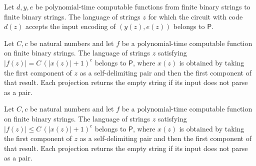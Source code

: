 \begin{theorem}
\label{Complexity.KarpLipton.pred_query}
\leanok
{}
Let $d,y,e$ be polynomial-time computable functions from finite binary strings to finite
binary strings. The language of strings $z$ for which the circuit with code $d(z)$ accepts
the input encoding of $(y(z),e(z))$ belongs to $\mathsf{P}$.
\end{theorem}

\begin{theorem}
\label{Complexity.KarpLipton.pred_len_eq}
\leanok
{}
Let $C,c$ be natural numbers and let $f$ be a polynomial-time computable function on
finite binary strings. The language of strings $z$ satisfying
$|f(z)| = C\,(|x(z)|+1)^c$ belongs to $\mathsf{P}$, where $x(z)$ is obtained by
taking the first component of $z$ as a self-delimiting pair and then the first component
of that result. Each projection returns the empty string if its input does not parse as a
pair.
\end{theorem}

\begin{theorem}
\label{Complexity.KarpLipton.pred_len_le}
\leanok
{}
Let $C,c$ be natural numbers and let $f$ be a polynomial-time computable function on
finite binary strings. The language of strings $z$ satisfying
$|f(z)| \le C\,(|x(z)|+1)^c$ belongs to $\mathsf{P}$, where $x(z)$ is obtained by
taking the first component of $z$ as a self-delimiting pair and then the first component
of that result. Each projection returns the empty string if its input does not parse as a
pair.
\end{theorem}

